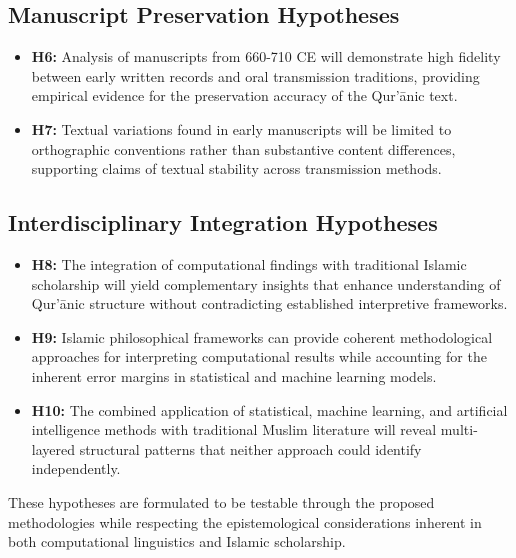 \subsection{Manuscript Preservation Hypotheses}\label{sec:hyp_manuscript_preservation}
\begin{itemize}
    \item \textbf{H6:} Analysis of manuscripts from 660-710 CE will demonstrate high fidelity between early written records and oral transmission traditions, providing empirical evidence for the preservation accuracy of the Qur'\=anic text.

    \item \textbf{H7:} Textual variations found in early manuscripts will be limited to orthographic conventions rather than substantive content differences, supporting claims of textual stability across transmission methods.
\end{itemize}


\subsection{Interdisciplinary Integration Hypotheses}\label{sec:hyp_interdisciplinary}
\begin{itemize}
    \item \textbf{H8:} The integration of computational findings with traditional Islamic scholarship will yield complementary insights that enhance understanding of Qur'\=anic structure without contradicting established interpretive frameworks.

    \item \textbf{H9:} Islamic philosophical frameworks can provide coherent methodological approaches for interpreting computational results while accounting for the inherent error margins in statistical and machine learning models.
    
    \item \textbf{H10:} The combined application of statistical, machine learning, and artificial intelligence methods with traditional Muslim literature will reveal multi-layered structural patterns that neither approach could identify independently.
\end{itemize}

These hypotheses are formulated to be testable through the proposed methodologies while respecting the epistemological considerations inherent in both computational linguistics and Islamic scholarship.

